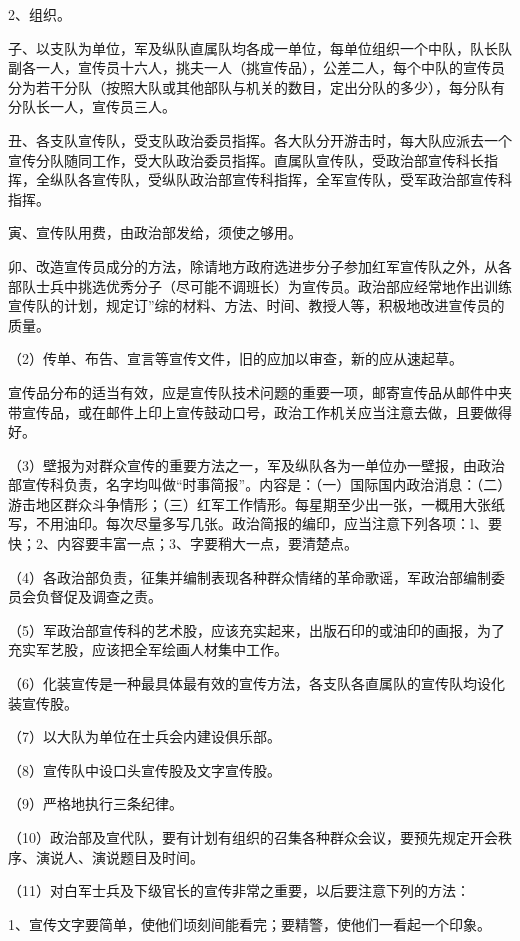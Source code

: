 2、组织。

子、以支队为单位，军及纵队直属队均各成一单位，每单位组织一个中队，队长队副各一人，宣传员十六人，挑夫一人（挑宣传品），公差二人，每个中队的宣传员分为若干分队（按照大队或其他部队与机关的数目，定出分队的多少），每分队有分队长一人，宣传员三人。

丑、各支队宣传队，受支队政治委员指挥。各大队分开游击时，每大队应派去一个宣传分队随同工作，受大队政治委员指挥。直属队宣传队，受政治部宣传科长指挥，全纵队各宣传队，受纵队政治部宣传科指挥，全军宣传队，受军政治部宣传科指挥。

寅、宣传队用费，由政治部发给，须使之够用。

卯、改造宣传员成分的方法，除请地方政府选进步分子参加红军宣传队之外，从各部队士兵中挑选优秀分子（尽可能不调班长）为宣传员。政治部应经常地作出训练宣传队的计划，规定订”综的材料、方法、时间、教授人等，积极地改进宣传员的质量。

（2）传单、布告、宣言等宣传文件，旧的应加以审查，新的应从速起草。

宣传品分布的适当有效，应是宣传队技术问题的重要一项，邮寄宣传品从邮件中夹带宣传品，或在邮件上印上宣传鼓动口号，政治工作机关应当注意去做，且要做得好。

（3）壁报为对群众宣传的重要方法之一，军及纵队各为一单位办一壁报，由政治部宣传科负责，名字均叫做“时事简报”。内容是：（一）国际国内政治消息：（二）游击地区群众斗争情形；（三）红军工作情形。每星期至少出一张，一概用大张纸写，不用油印。每次尽量多写几张。政治简报的编印，应当注意下列各项：l、要快；2、内容要丰富一点；3、字要稍大一点，要清楚点。

（4）各政治部负责，征集并编制表现各种群众情绪的革命歌谣，军政治部编制委员会负督促及调查之责。

（5）军政治部宣传科的艺术股，应该充实起来，出版石印的或油印的画报，为了充实军艺股，应该把全军绘画人材集中工作。

（6）化装宣传是一种最具体最有效的宣传方法，各支队各直属队的宣传队均设化装宣传股。

（7）以大队为单位在士兵会内建设俱乐部。

（8）宣传队中设口头宣传股及文字宣传股。

（9）严格地执行三条纪律。

（10）政治部及宣代队，要有计划有组织的召集各种群众会议，要预先规定开会秩序、演说人、演说题目及时间。

（11）对白军士兵及下级官长的宣传非常之重要，以后要注意下列的方法：

1、宣传文字要简单，使他们顷刻间能看完；要精警，使他们一看起一个印象。

